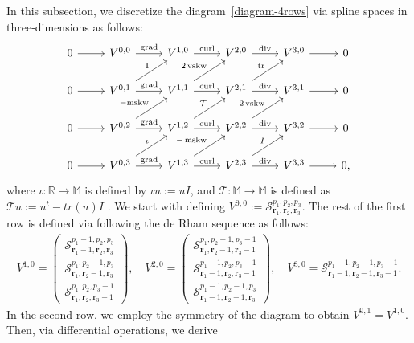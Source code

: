 \documentclass[final]{amsart}%
\newcommand{\0}{\mathaccent23}
\newcommand\tr{\operatorname{tr}}
\newcommand\vskw{\operatorname{vskw}}
\newcommand\mskw{\operatorname{mskw}}
\newcommand\grad{\operatorname{grad}}
\renewcommand\div{\operatorname{div}}
\newcommand\curl{\operatorname{curl}}
\newcommand{\br}{\mathbf r}
\begin{document}
In this subsection, we discretize the diagram~\eqref{diagram-4rows} via spline spaces in three-dimensions as follows:
 \begin{equation}\label{diagram-4rows-V}
\begin{tikzcd}
0 \arrow{r} &V^{0, 0} \arrow{r}{\grad} &V^{1, 0} \arrow{r}{\curl} & V^{2, 0} \arrow{r}{\div} & V^{3, 0} \arrow{r}{}& 0\\
0 \arrow{r}&
V^{0, 1}
\arrow{r}{\grad} \arrow[ur, "\mathrm{I}"]&
V^{1, 1}  \arrow{r}{\curl} \arrow[ur, "2\vskw"]&V^{2, 1}  \arrow{r}{\div} \arrow[ur, "\tr"]&V^{3, 1}  \arrow{r}{} & 0\\
0 \arrow{r}&
V^{0, 2}
\arrow{r}{\grad} \arrow[ur, "-\mathrm{mskw}"]&
V^{1, 2}  \arrow{r}{\curl} \arrow[ur, "\mathcal{T}"]&V^{2, 2}  \arrow{r}{\div} \arrow[ur, "2\vskw"]&V^{3, 2}  \arrow{r}{} & 0\\
0 \arrow{r} &V^{0, 3}\arrow{r}{\grad} \arrow[ur, "\iota"]&V^{1, 3} \arrow{r}{\curl} \arrow[ur, "-\mskw"]&V^{2, 3} \arrow{r}{\div}\arrow[ur, "I"] & V^{3, 3} \arrow{r}{} & 0,
 \end{tikzcd}
\end{equation}
where $\iota: \mathbb{R}\to \mathbb{M}$ is defined by $\iota u:= uI$, and $\mathcal{T}:\mathbb{M}\to \mathbb{M}$ is defined as $\mathcal{T}u:= u^t-tr(u)I$ \cite{arnold2021complexes}. 
We start with defining $V^{0, 0}:=\mathcal S^{p_{1}, p_{2}, p_{3}}_{  \br_{1},  \br_{2},  \br_{3}}$. The rest of the first row is defined via following the de Rham sequence as follows: 
\begin{gather}
  \label{diagram-V10}
V^{1, 0}=
\begin{pmatrix}
\mathcal S^{p_{1}-1, p_{2}, p_{3}}_{  \br_{1}-1,  \br_{2},  \br_{3}}\\
\mathcal S^{p_{1}, p_{2}-1, p_{3}}_{  \br_{1},  \br_{2}-1,  \br_{3}}\\
\mathcal S^{p_{1}, p_{2}, p_{3}-1}_{  \br_{1},  \br_{2},  \br_{3}-1}
\end{pmatrix},
\quad
V^{2, 0}=
\begin{pmatrix}
\mathcal S^{p_{1}, p_{2}-1, p_{3}-1}_{  \br_{1},  \br_{2}-1,  \br_{3}-1}\\
\mathcal S^{p_{1}-1, p_{2}, p_{3}-1}_{  \br_{1}-1,  \br_{2},  \br_{3}-1}\\
\mathcal S^{p_{1}-1, p_{2}-1, p_{3}}_{  \br_{1}-1,  \br_{2}-1,  \br_{3}}
\end{pmatrix},
\quad
V^{3, 0}=\mathcal S^{p_{1}-1, p_{2}-1, p_{3}-1}_{  \br_{1}-1,  \br_{2}-1,  \br_{3}-1}.
\end{gather}
In the second row, we employ the symmetry of the diagram to obtain $V^{0, 1}= V^{1, 0}$. Then, via differential operations, we derive
\end{document}
